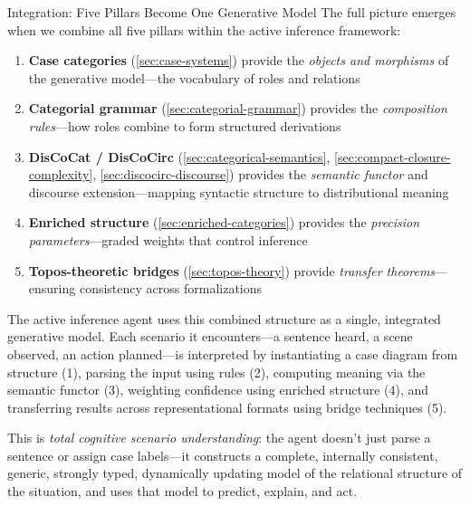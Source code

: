 \documentclass[
  ignorenonframetext,
]{beamer}
\providecommand{\tightlist}{%
  \setlength{\itemsep}{0pt}\setlength{\parskip}{0pt}}
\begin{document}
\begin{frame}{Integration: Five Pillars Become One Generative Model}
\protect{}\label{integration-five-pillars-become-one-generative-model}
The full picture emerges when we combine all five pillars within the
active inference framework:

\begin{enumerate}
\tightlist
\item
  \textbf{Case categories} (\autoref{sec:case-systems}) provide the
  \emph{objects and morphisms} of the generative model---the vocabulary
  of roles and relations
\item
  \textbf{Categorial grammar} (\autoref{sec:categorial-grammar})
  provides the \emph{composition rules}---how roles combine to form
  structured derivations
\item
  \textbf{DisCoCat / DisCoCirc} (\autoref{sec:categorical-semantics},
  \autoref{sec:compact-closure-complexity},
  \autoref{sec:discocirc-discourse}) provides the \emph{semantic
  functor} and discourse extension---mapping syntactic structure to
  distributional meaning
\item
  \textbf{Enriched structure} (\autoref{sec:enriched-categories})
  provides the \emph{precision parameters}---graded weights that control
  inference
\item
  \textbf{Topos-theoretic bridges} (\autoref{sec:topos-theory}) provide
  \emph{transfer theorems}---ensuring consistency across formalizations
\end{enumerate}

The active inference agent uses this combined structure as a single,
integrated generative model. Each scenario it encounters---a sentence
heard, a scene observed, an action planned---is interpreted by
instantiating a case diagram from structure (1), parsing the input using
rules (2), computing meaning via the semantic functor (3), weighting
confidence using enriched structure (4), and transferring results across
representational formats using bridge techniques (5).

This is \emph{total cognitive scenario understanding}: the agent doesn't
just parse a sentence or assign case labels---it constructs a complete,
internally consistent, generic, strongly typed, dynamically updating
model of the relational structure of the situation, and uses that model
to predict, explain, and act.
\end{frame}
\end{document}
